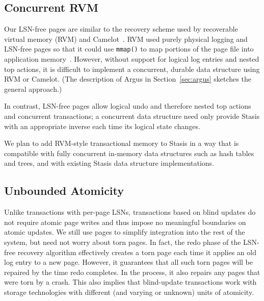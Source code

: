 \documentclass[letterpaper,twocolumn,10pt]{article}
\newcommand{\yad}{Stasis\xspace}
\begin{document}
\subsection{Concurrent RVM}

Our LSN-free pages are similar to the recovery scheme used by
recoverable virtual memory (RVM) and Camelot~\cite{camelot}. RVM
used purely physical logging and LSN-free pages so that it
could use {\tt mmap()} to map portions of the page file into application
memory~\cite{lrvm}.  However, without support for logical log entries
and nested top actions, it is difficult to implement a
concurrent, durable data structure using RVM or Camelot.  (The description of
Argus in Section~\ref{sec:argus} sketches the
general approach.)

In contrast, LSN-free pages allow logical
undo and therefore nested top actions and concurrent
transactions; a concurrent data structure need only provide \yad
with an appropriate inverse each time its logical state changes.

We plan to add RVM-style transactional memory to \yad in a way that is
compatible with fully concurrent in-memory data structures such as
hash tables and trees, and with existing
\yad data structure implementations.


\subsection{Unbounded Atomicity}
\label{sec:torn-page}


Unlike transactions with per-page LSNs, transactions based on blind 
updates do not require atomic page writes
and thus impose no meaningful boundaries on atomic updates.  We still
use pages to simplify integration into the rest of the system, but
need not worry about torn pages.  In fact, the redo phase of the
LSN-free recovery algorithm effectively creates a torn page each time it
applies an old log entry to a new page.  However, it guarantees that
all such torn pages will be repaired by the time redo completes.  In
the process, it also repairs any pages that were torn by a crash.
This also implies that blind-update transactions work with storage technologies with
different (and varying or unknown) units of atomicity.
\end{document}

